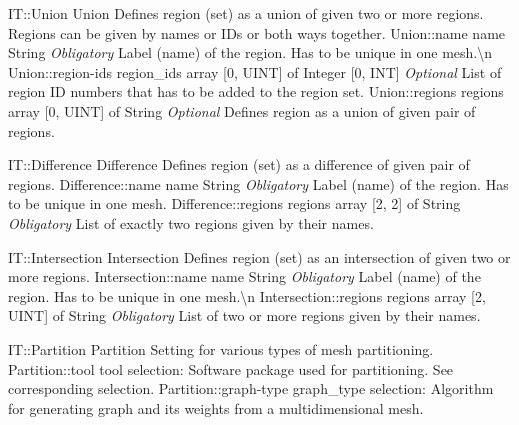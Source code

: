 \begin{RecordType}
	{IT::Union}
	{Union}
	{}%
	{}%
	{{{Defines region (set) as a union of given two or more regions.
Regions can be given by names or IDs or both ways together.}%
}}
		\RecKey
			{Union::name}
			{name}
			{{String}}{}
			{ \it{Obligatory}}
			{{{Label (name) of the region.
Has to be unique in one mesh.{\textbackslash}n}%
}}
		\RecKey
			{Union::region-ids}
			{region{\_}ids}
			{{array [0, UINT] of }{Integer [0, INT]}}{}
			{ \it{Optional}}
			{{{List of region ID numbers that has to be added to the region set.}%
}}
		\RecKey
			{Union::regions}
			{regions}
			{{array [0, UINT] of }{String}}{}
			{ \it{Optional}}
			{{{Defines region as a union of given pair of regions.}%
}}
\end{RecordType}
\begin{RecordType}
	{IT::Difference}
	{Difference}
	{}%
	{}%
	{{{Defines region (set) as a difference of given pair of regions.}%
}}
		\RecKey
			{Difference::name}
			{name}
			{{String}}{}
			{ \it{Obligatory}}
			{{{Label (name) of the region.
Has to be unique in one mesh.}%
}}
		\RecKey
			{Difference::regions}
			{regions}
			{{array [2, 2] of }{String}}{}
			{ \it{Obligatory}}
			{{{List of exactly two regions given by their names.}%
}}
\end{RecordType}
\begin{RecordType}
	{IT::Intersection}
	{Intersection}
	{}%
	{}%
	{{{Defines region (set) as an intersection of given two or more regions.}%
}}
		\RecKey
			{Intersection::name}
			{name}
			{{String}}{}
			{ \it{Obligatory}}
			{{{Label (name) of the region.
Has to be unique in one mesh.{\textbackslash}n}%
}}
		\RecKey
			{Intersection::regions}
			{regions}
			{{array [2, UINT] of }{String}}{}
			{ \it{Obligatory}}
			{{{List of two or more regions given by their names.}%
}}
\end{RecordType}
\begin{RecordType}
	{IT::Partition}
	{Partition}
	{}%
	{}%
	{{{Setting for various types of mesh partitioning.}%
}}
		\RecKey
			{Partition::tool}
			{tool}
			{{selection: }}{}
			{ }
			{{{Software package used for partitioning.
See corresponding selection.}%
}}
		\RecKey
			{Partition::graph-type}
			{graph{\_}type}
			{{selection: }}{}
			{ }
			{{{Algorithm for generating graph and its weights from a multidimensional mesh.}%
}}
\end{RecordType}
